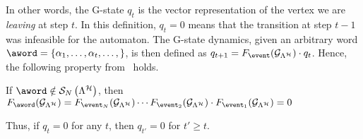 In other words, the G-state $q_t$ is the vector representation of the vertex we are \emph{leaving} at step $t$.
In this definition, $q_t=0$ means that the transition at step $t-1$ was infeasible for the automaton.
The G-state dynamics, given an arbitrary word $\aword=\{\alpha_1,\dots,\alpha_t,\dots,\}$, is then defined as $q_{t+1} = F_{\event} ( \GG{\Lambda^\strat} )\cdot q_t$.
Hence, the following property from~\cite{xu2012matrix} holds.
\begin{lemma}%
    \label{cor:Fseqnotinlambda}%
    If $\aword \notin \sset{N}{ \Lambda^\strat }$, then $F_{\aword} ( \GG{\Lambda^\strat} ) =
    F_{\event_N} ( \GG{\Lambda^\strat} )\cdots F_{\event_2} ( \GG{\Lambda^\strat} )\cdot F_{\event_1} ( \GG{\Lambda^\strat} ) = 0$
\end{lemma}
Thus, if $q_t=0$ for any $t$, then $q_{t'}=0$ for $t' \geq t$.
